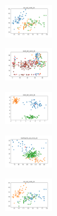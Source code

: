 \vspace*{\fill}
\newpage
\vspace*{\fill}

\begin{figure}[H]    
    \centering
    \begin{subfigure}
        \centering
        \includegraphics[width=0.234\textwidth]{img/aggsf/iris_set_const_20_949004259_clust.png}
    \end{subfigure}
    \hfill
    \begin{subfigure}
        \centering
        \includegraphics[width=0.234\textwidth]{img/aggsf/ecoli_set_const_20_949004259_clust.png}
    \end{subfigure}
    \hfill
    \begin{subfigure}
        \centering
        \includegraphics[width=0.234\textwidth]{img/aggsf/rand_set_const_20_949004259_clust.png}
    \end{subfigure}
    \hfill
    \begin{subfigure}
        \centering
        \includegraphics[width=0.234\textwidth]{img/aggsf/newthyroid_set_const_20_949004259_clust.png}
    \end{subfigure}
    \hfill
    \begin{subfigure}
        \centering
        \includegraphics[width=0.234\textwidth]{img/aggsf/iris_set_const_20_589741062_clust.png}

\end{subfigure}
\end{figure}
